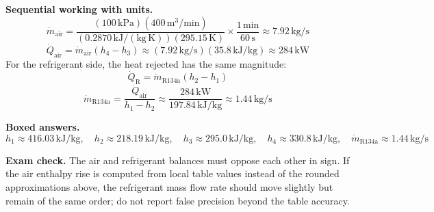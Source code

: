 \textbf{Sequential working with units.}
\[
\dot m_{\mathrm{air}} = \frac{(100\,\mathrm{kPa})(400\,\mathrm{m^3/min})}{(0.2870\,\mathrm{kJ/(kg\,K)})(295.15\,\mathrm{K})}
\times \frac{1\,\mathrm{min}}{60\,\mathrm{s}}
\approx 7.92\,\mathrm{kg/s}
\]
\[
\dot Q_{\mathrm{air}} = \dot m_{\mathrm{air}}(h_4-h_3) \approx (7.92\,\mathrm{kg/s})(35.8\,\mathrm{kJ/kg}) \approx 284\,\mathrm{kW}
\]
For the refrigerant side, the heat rejected has the same magnitude:
\[
\dot Q_{\mathrm{R}} = \dot m_{\mathrm{R134a}}(h_2-h_1)
\]
\[
\dot m_{\mathrm{R134a}} = \frac{\dot Q_{\mathrm{air}}}{h_1-h_2} \approx \frac{284\,\mathrm{kW}}{197.84\,\mathrm{kJ/kg}} \approx 1.44\,\mathrm{kg/s}
\]

\textbf{Boxed answers.}
\[
\boxed{h_1\approx 416.03\,\mathrm{kJ/kg},\quad h_2\approx 218.19\,\mathrm{kJ/kg},\quad h_3\approx 295.0\,\mathrm{kJ/kg},\quad h_4\approx 330.8\,\mathrm{kJ/kg},\quad \dot m_{\mathrm{R134a}}\approx 1.44\,\mathrm{kg/s}}
\]

\textbf{Exam check.} The air and refrigerant balances must oppose each other in sign. If the air enthalpy rise is computed from local table values instead of the rounded approximations above, the refrigerant mass flow rate should move slightly but remain of the same order; do not report false precision beyond the table accuracy.
